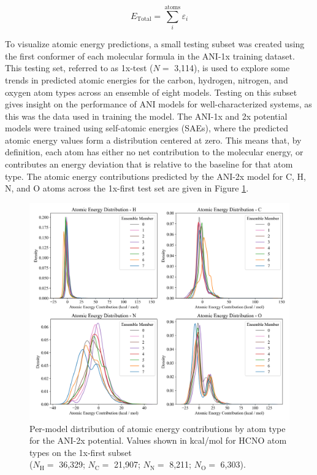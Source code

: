 \begin{equation}
    E_{\text{Total}} = \sum_{i}^{\text{atoms}} \varepsilon_i
    \label{eq:total_E_sum_AEs}
\end{equation}

To visualize atomic energy predictions, a small testing subset was created using the first conformer of each molecular formula in the ANI-1x training dataset.
This testing set, referred to as 1x-test ($N=$ 3,114), is used to explore some trends in predicted atomic energies for the carbon, hydrogen, nitrogen, and oxygen atom types across an ensemble of eight models.
Testing on this subset gives insight on the performance of ANI models for well-characterized systems, as this was the data used in training the model.
The ANI-1x and 2x potential models were trained using self-atomic energies (SAEs), where the predicted atomic energy values form a distribution centered at zero. 
This means that, by definition, each atom has either no net contribution to the molecular energy, or contributes an energy deviation that is relative to the baseline for that atom type.
The atomic energy contributions predicted by the ANI-2x model for C, H, N, and O atoms across the 1x-first test set are given in Figure \ref{fig:2x_ae_per_model}.

\begin{figure}[!h]
    \centering
    \includegraphics[width=1\linewidth]{Images/2x_outputs/2x_1x-first_ae-per-model.png}
    \caption[Atomic energies predicted by ANI-2x]{Per-model distribution of atomic energy contributions by atom type for the ANI-2x potential. Values shown in kcal/mol for HCNO atom types on the 1x-first subset\\($N_\text{H}=$ 36,329; 
    $N_\text{C}=$ 21,907; 
    $N_\text{N}=$ 8,211;
    $N_\text{O}=$ 6,303).}
    \label{fig:2x_ae_per_model}
\end{figure}

